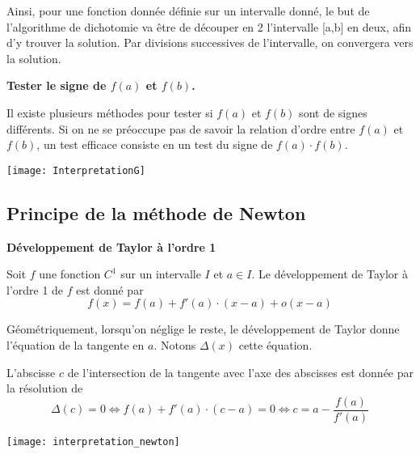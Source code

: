 \begin{minipage}[c]{.6\linewidth}
Ainsi, pour une fonction donnée définie sur un intervalle donné, le but de l'algorithme de dichotomie va être de découper en 2 l'intervalle [a,b] en deux, afin d'y trouver la solution. Par divisions successives de l'intervalle, on convergera vers la solution.

\begin{rem}
\textbf{Tester le signe de $f(a)$ et $f(b)$.}

Il existe plusieurs méthodes pour tester si $f(a)$ et $f(b)$ sont de signes différents. Si on ne se préoccupe pas de savoir la relation d'ordre entre $f(a)$ et $f(b)$, un test efficace consiste en un test du signe de $f(a)\cdot f(b)$. 
\end{rem}

\end{minipage} \hfill
\begin{minipage}[c]{.35\linewidth}
\begin{center}
\texttt{[image: InterpretationG]}
\end{center}
\end{minipage}

\subsection{Principe de la méthode de Newton}
\begin{theorem}
\textbf{Développement de Taylor à l'ordre 1}

Soit $f$ une fonction $C^1$ sur un intervalle $I$ et $a\in I$. Le développement de Taylor à l'ordre 1 de $f$ est donné par 
$$
f(x)=f(a)+ f'(a)\cdot(x-a)+\mathit{o}(x-a)
$$
\end{theorem}


\begin{minipage}[c]{.6\linewidth}
Géométriquement, lorsqu'on néglige le reste, le développement de Taylor donne l'équation de la tangente en $a$. Notons $\Delta(x)$ cette équation.

L'abscisse $c$ de l'intersection de la tangente avec l'axe des abscisses est donnée par la résolution de 
$$
\Delta(c)=0 
\Longleftrightarrow f(a)+ f'(a)\cdot(c-a) = 0
\Longleftrightarrow c = a-\dfrac{f(a)}{f'(a)}
$$
\end{minipage} \hfill
\begin{minipage}[c]{.35\linewidth}
\begin{center}
\texttt{[image: interpretation\_newton]}
\end{center}
\end{minipage}

